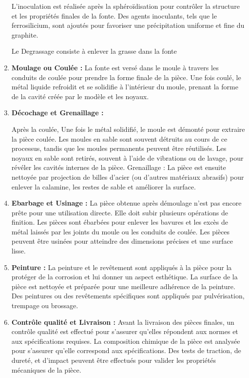 \documentclass[12pt]{article}
\begin{document}
\begin{enumerate}
    L'inoculation est réalisée après la sphéroïdisation pour contrôler la structure 
    et les propriétés finales de la fonte. Des agents inoculants, tels que le 
    ferrosilicium, sont ajoutés pour favoriser une précipitation uniforme et fine 
    du graphite.

    Le Degrassage consiste  à enlever la grasse dans la fonte

    
    \item \textbf{Moulage ou Coulée :} La fonte est  versé dans 
    le moule à travers les conduits de coulée pour prendre la forme finale de la pièce. Une 
    fois coulé, le métal liquide refroidit et se solidifie à l'intérieur du moule, prenant la 
    forme de la cavité créée par le modèle et les noyaux.



    \item \textbf{Décochage et Grenaillage :} 

    Après la coulée, Une fois le métal solidifié, le moule est démonté pour extraire 
    la pièce coulée. Les moules en sable sont souvent détruits au cours de ce processus,
    tandis que les moules permanents peuvent être réutilisés. Les noyaux en sable sont 
    retirés, souvent à l'aide de vibrations ou de lavage, pour révéler les cavités 
    internes de la pièce. Grenaillage : La pièce est ensuite nettoyée par projection 
    de billes d'acier (ou d'autres matériaux abrasifs) pour enlever la calamine, les 
    restes de sable et améliorer la surface.
    
    \item \textbf{Ebarbage et Usinage :} 
    La pièce obtenue après démoulage n'est pas encore prête pour une utilisation directe. 
    Elle doit subir plusieurs opérations de finition. Les pièces sont ébarbées pour 
    enlever les bavures et les excès de métal laissés par les joints du moule ou les 
    conduits de coulée. Les pièces peuvent être usinées pour atteindre des dimensions 
    précises et une surface lisse.
    

    \item \textbf{Peinture :} La peinture et le revêtement sont appliqués à la pièce 
    pour la protéger de la corrosion et lui donner un aspect esthétique. La surface de 
    la pièce est nettoyée et préparée pour une meilleure adhérence de la peinture.
    Des peintures ou des revêtements spécifiques sont appliqués par pulvérisation, 
    trempage ou brossage.



    \item \textbf{Contrôle qualité et Livraison :} Avant la livraison des pièces finales, un 
    contrôle qualité est effectué pour s'assurer qu'elles répondent aux normes et 
    aux spécifications requises. La composition chimique de la pièce est analysée pour 
    s'assurer qu'elle correspond aux spécifications. Des tests de traction, de dureté, 
    et d'impact peuvent être effectués pour valider les propriétés mécaniques de la 
    pièce.
\end{enumerate}
\end{document}
